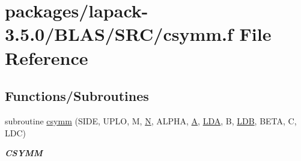 \hypertarget{lapack-3_85_80_2BLAS_2SRC_2csymm_8f}{}\section{packages/lapack-\/3.5.0/\+B\+L\+A\+S/\+S\+R\+C/csymm.f File Reference}
\label{lapack-3_85_80_2BLAS_2SRC_2csymm_8f}
\subsection*{Functions/\+Subroutines}
\begin{DoxyCompactItemize}
\item 
subroutine \hyperlink{group__complex__blas__level3_ga2490eea9e962fd69b9902e22aaa3a634}{csymm} (S\+I\+D\+E, U\+P\+L\+O, M, \hyperlink{polmisc_8c_a0240ac851181b84ac374872dc5434ee4}{N}, A\+L\+P\+H\+A, \hyperlink{classA}{A}, \hyperlink{example__user_8c_ae946da542ce0db94dced19b2ecefd1aa}{L\+D\+A}, B, \hyperlink{example__user_8c_a50e90a7104df172b5a89a06c47fcca04}{L\+D\+B}, B\+E\+T\+A, C, L\+D\+C)
\begin{DoxyCompactList}\small\item\em {\bfseries C\+S\+Y\+M\+M} \end{DoxyCompactList}\end{DoxyCompactItemize}
